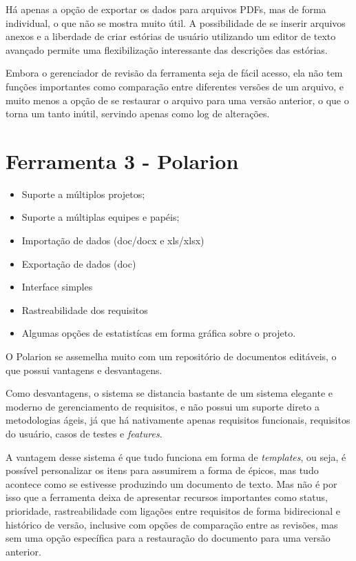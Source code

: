 Há apenas a opção de exportar os dados para arquivos PDFs, mas de forma individual, o que não se mostra muito útil. A possibilidade de se inserir arquivos anexos e a liberdade de criar estórias de usuário utilizando um editor de texto avançado permite uma flexibilização interessante das descrições das estórias.

Embora o gerenciador de revisão da ferramenta seja de fácil acesso, ela não tem funções importantes como comparação entre diferentes versões de um arquivo, e muito menos a opção de se restaurar o arquivo para uma versão anterior, o que o torna um tanto inútil, servindo apenas como log de alterações.

\section{Ferramenta 3 - Polarion}
\begin{itemize}
  \item Suporte a múltiplos projetos;
  \item Suporte a múltiplas equipes e papéis;
  \item Importação de dados (doc/docx e xls/xlsx)
  \item Exportação de dados (doc)
  \item Interface simples
  \item Rastreabilidade dos requisitos
  \item Algumas opções de estatistícas em forma gráfica sobre o projeto.
\end{itemize}

O Polarion se assemelha muito com um repositório de documentos editáveis, o que possui vantagens e desvantagens.

Como desvantagens, o sistema se distancia bastante de um sistema elegante e moderno de gerenciamento de requisitos, e não possui um suporte direto a metodologias ágeis, já que há nativamente apenas requisitos funcionais, requisitos do usuário,
casos de testes e \emph{features}.

A vantagem desse sistema é que tudo funciona em forma de \emph{templates}, ou seja, é possível personalizar os itens para assumirem a forma de épicos, mas tudo acontece como se estivesse produzindo um documento de texto. Mas não é por isso que a ferramenta deixa de apresentar recursos importantes como status, prioridade, rastreabilidade com ligações entre requisitos de forma bidirecional e histórico de versão, inclusive com opções de comparação entre as revisões, mas sem uma opção específica para a restauração do documento para uma versão anterior.


